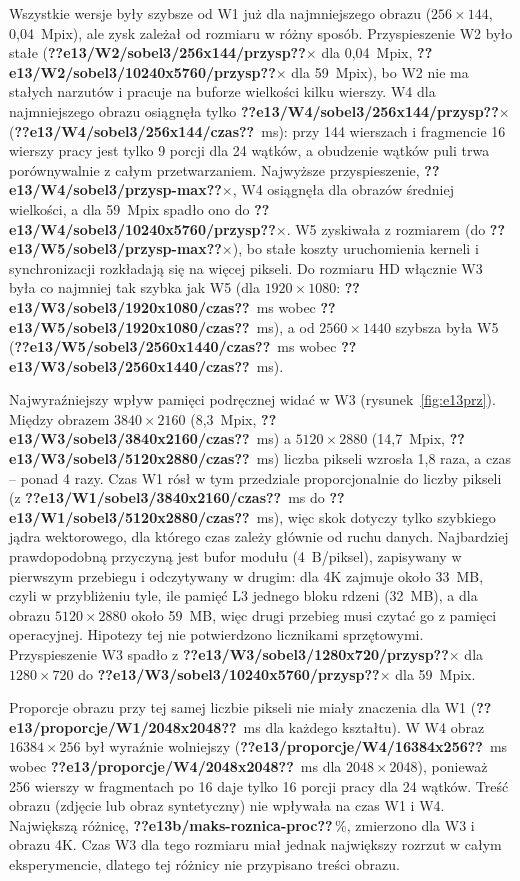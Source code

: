 \documentclass[12pt,a4paper]{article}
\providecommand{\wynik}[1]{\textbf{??#1??}}
\begin{document}
Wszystkie wersje były szybsze od W1 już dla najmniejszego obrazu ($256\times144$, 0,04~Mpix), ale zysk zależał od rozmiaru w różny sposób. Przyspieszenie W2 było stałe (\wynik{e13/W2/sobel3/256x144/przysp}$\times$ dla 0,04~Mpix, \wynik{e13/W2/sobel3/10240x5760/przysp}$\times$ dla 59~Mpix), bo W2 nie ma stałych narzutów i pracuje na buforze wielkości kilku wierszy. W4 dla najmniejszego obrazu osiągnęła tylko \wynik{e13/W4/sobel3/256x144/przysp}$\times$ (\wynik{e13/W4/sobel3/256x144/czas}~ms): przy 144 wierszach i fragmencie 16 wierszy pracy jest tylko 9 porcji dla 24 wątków, a obudzenie wątków puli trwa porównywalnie z całym przetwarzaniem. Najwyższe przyspieszenie, \wynik{e13/W4/sobel3/przysp-max}$\times$, W4 osiągnęła dla obrazów średniej wielkości, a dla 59~Mpix spadło ono do \wynik{e13/W4/sobel3/10240x5760/przysp}$\times$. W5 zyskiwała z rozmiarem (do \wynik{e13/W5/sobel3/przysp-max}$\times$), bo stałe koszty uruchomienia kerneli i synchronizacji rozkładają się na więcej pikseli. Do rozmiaru HD włącznie W3 była co najmniej tak szybka jak W5 (dla $1920\times1080$: \wynik{e13/W3/sobel3/1920x1080/czas}~ms wobec \wynik{e13/W5/sobel3/1920x1080/czas}~ms), a od $2560\times1440$ szybsza była W5 (\wynik{e13/W5/sobel3/2560x1440/czas}~ms wobec \wynik{e13/W3/sobel3/2560x1440/czas}~ms).

Najwyraźniejszy wpływ pamięci podręcznej widać w W3 (rysunek~\ref{fig:e13prz}). Między obrazem $3840\times2160$ (8,3~Mpix, \wynik{e13/W3/sobel3/3840x2160/czas}~ms) a $5120\times2880$ (14,7~Mpix, \wynik{e13/W3/sobel3/5120x2880/czas}~ms) liczba pikseli wzrosła 1,8 raza, a czas -- ponad 4 razy. Czas W1 rósł w tym przedziale proporcjonalnie do liczby pikseli (z \wynik{e13/W1/sobel3/3840x2160/czas}~ms do \wynik{e13/W1/sobel3/5120x2880/czas}~ms), więc skok dotyczy tylko szybkiego jądra wektorowego, dla którego czas zależy głównie od ruchu danych. Najbardziej prawdopodobną przyczyną jest bufor modułu (4~B/piksel), zapisywany w pierwszym przebiegu i odczytywany w drugim: dla 4K zajmuje około 33~MB, czyli w przybliżeniu tyle, ile pamięć L3 jednego bloku rdzeni (32~MB), a dla obrazu $5120\times2880$ około 59~MB, więc drugi przebieg musi czytać go z pamięci operacyjnej. Hipotezy tej nie potwierdzono licznikami sprzętowymi. Przyspieszenie W3 spadło z \wynik{e13/W3/sobel3/1280x720/przysp}$\times$ dla $1280\times720$ do \wynik{e13/W3/sobel3/10240x5760/przysp}$\times$ dla 59~Mpix.

Proporcje obrazu przy tej samej liczbie pikseli nie miały znaczenia dla W1 (\wynik{e13/proporcje/W1/2048x2048}~ms dla każdego kształtu). W W4 obraz $16384\times256$ był wyraźnie wolniejszy (\wynik{e13/proporcje/W4/16384x256}~ms wobec \wynik{e13/proporcje/W4/2048x2048}~ms dla $2048\times2048$), ponieważ 256 wierszy w fragmentach po 16 daje tylko 16 porcji pracy dla 24 wątków. Treść obrazu (zdjęcie lub obraz syntetyczny) nie wpływała na czas W1 i W4. Największą różnicę, \wynik{e13b/maks-roznica-proc}\,\%, zmierzono dla W3 i obrazu 4K. Czas W3 dla tego rozmiaru miał jednak największy rozrzut w całym eksperymencie, dlatego tej różnicy nie przypisano treści obrazu.
\end{document}
